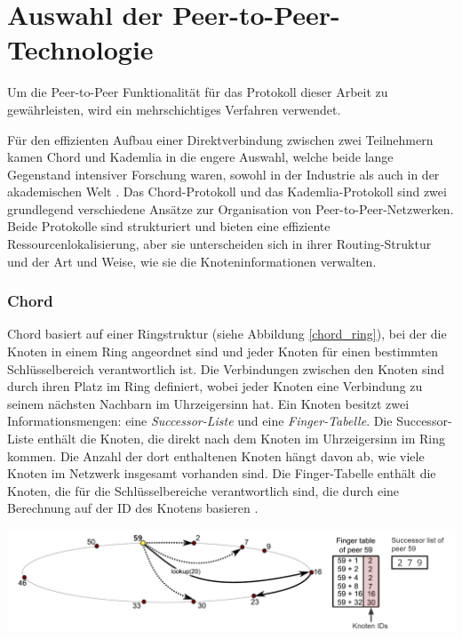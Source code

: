 \section{Auswahl der Peer-to-Peer-Technologie}
\label{sec:grundlagen_des_protokolls}


Um die Peer-to-Peer Funktionalität für das Protokoll dieser Arbeit zu gewährleisten, wird ein mehrschichtiges Verfahren verwendet.

Für den effizienten Aufbau einer Direktverbindung zwischen zwei Teilnehmern kamen Chord und Kademlia in die engere Auswahl, welche beide lange Gegenstand intensiver Forschung waren, sowohl in der Industrie als auch in der akademischen Welt \parencite[S. 808]{MedranoChavez_ChordKademliaHighChurnScenarios}. 
Das Chord-Protokoll und das Kademlia-Protokoll sind zwei grundlegend verschiedene Ansätze zur Organisation von Peer-to-Peer-Netzwerken. Beide Protokolle sind strukturiert und bieten eine effiziente Ressourcenlokalisierung, aber sie unterscheiden sich in ihrer Routing-Struktur und der Art und Weise, wie sie die Knoteninformationen verwalten.

\subsubsection{Chord}
Chord basiert auf einer Ringstruktur (siehe Abbildung \ref{chord_ring}), bei der die Knoten in einem Ring angeordnet sind und jeder Knoten für einen bestimmten Schlüsselbereich verantwortlich ist. Die Verbindungen zwischen den Knoten sind durch ihren Platz im Ring definiert, wobei jeder Knoten eine Verbindung zu seinem nächsten Nachbarn im Uhrzeigersinn hat. Ein Knoten besitzt zwei Informationsmengen: eine \textit{Successor-Liste} und eine \textit{Finger-Tabelle}. Die Successor-Liste enthält die Knoten, die direkt nach dem Knoten im Uhrzeigersinn im Ring kommen. Die Anzahl der dort enthaltenen Knoten hängt davon ab, wie viele Knoten im Netzwerk insgesamt vorhanden sind. Die Finger-Tabelle enthält die Knoten, die für die Schlüsselbereiche verantwortlich sind, die durch eine Berechnung auf der ID des Knotens basieren \Parencite[S. 810-811]{MedranoChavez_ChordKademliaHighChurnScenarios}.

\begin{center}
    \captionsetup{type=figure}
    \includegraphics[width=1\linewidth]{images/chord_ring_altered.png}
    \label{chord_ring}
\end{center}

